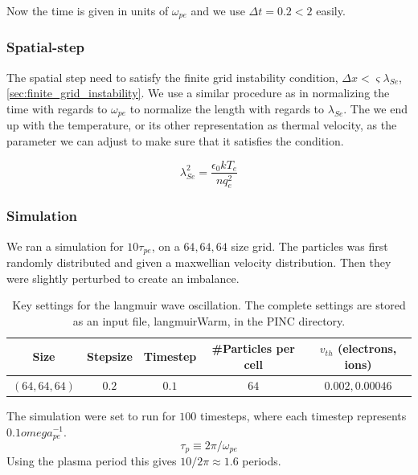         Now the time is given in units of \(\omega_{pe}\) and we use \(\Delta t = 0.2 < 2\) easily.

        \subsubsection{Spatial-step}
        The spatial step need to satisfy the finite grid instability condition,
        \(\Delta x < \varsigma \lambda_{Se}\), \cref{sec:finite_grid_instability}.
        We use a similar procedure as in normalizing the time with regards to \(\omega_{pe}\)
        to normalize the length with regards to \(\lambda_{Se}\). The we end up with
        the temperature, or its other representation as thermal velocity, as the parameter we can adjust to make sure that it satisfies the
        condition.

        \begin{equation}
            \lambda_{Se}^2 = \frac{\epsilon_0 kT_e}{nq^2_e}
        \end{equation}


		\subsubsection{Simulation}
			We ran a simulation for \(10\tau_{pe}\), on a \(64,64,64\) size grid. The particles
			was first randomly distributed and given a maxwellian velocity distribution.
			Then they were slightly perturbed to create an imbalance.

			\begin{table}
					\center
			\begin{tabular}{c|c|c|c|c}
				Size 			&	Stepsize &	Timestep &\#Particles per cell	& \(v_{th}\) (electrons, ions)
				\\ \hline
				\((64,64,64)\)	& \(0.2\)	& \(0.1\)  	&	\(64\)	& 		\(0.002, 0.00046\)
			\end{tabular}
			\caption{Key settings for the langmuir wave oscillation. The complete settings are
			stored as an input file, langmuirWarm, in the PINC directory.}
			\end{table}

			The simulation were set to run for \(100\) timesteps, where each timestep represents \(0.1omega_{pe}^{-1}\).
			\begin{equation}
				\tau_p \equiv 2\pi/\omega_{pe}
			\end{equation}
			Using the plasma period this gives \(10/2\pi\approx 1.6\) periods.

